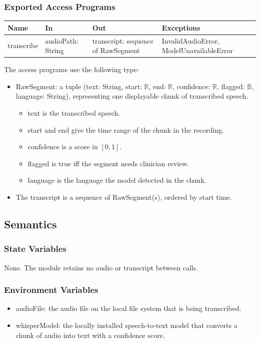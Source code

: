 \documentclass[12pt, titlepage]{article}
\begin{document}
\subsubsection{Exported Access Programs}
\begin{center}
\begin{tabular}{p{3cm} p{3.5cm} p{4cm} p{4cm}}
\hline
\textbf{Name} & \textbf{In} & \textbf{Out} & \textbf{Exceptions} \\
\hline
transcribe & audioPath: String & transcript: sequence of RawSegment & InvalidAudioError, ModelUnavailableError \\
\hline
\end{tabular}
\end{center}

\noindent The access programs use the following type:
\begin{itemize}
\item RawSegment: a tuple (text: String, start: $\mathbb{R}$, end: $\mathbb{R}$, confidence: $\mathbb{R}$, flagged: $\mathbb{B}$, language: String), representing one displayable chunk of transcribed speech.
  \begin{itemize}
  \item text is the transcribed speech.
  \item start and end give the time range of the chunk in the recording.
  \item confidence is a score in $[0,1]$.
  \item flagged is true iff the segment needs clinician review.
  \item language is the language the model detected in the chunk.
  \end{itemize}
\item The transcript is a sequence of RawSegment(s), ordered by start time.
\end{itemize}

\subsection{Semantics}

\subsubsection{State Variables}
None. The module retains no audio or transcript between calls.

\subsubsection{Environment Variables}
\begin{itemize}
\item audioFile: the audio file on the local file system that is being transcribed.
\item whisperModel: the locally installed speech-to-text model that converts a chunk of audio into text with a confidence score.
\end{itemize}
\end{document}
